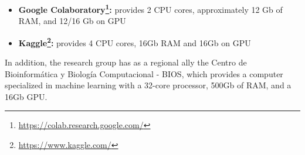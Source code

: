 \begin{itemize}
    \item \textbf{Google Colaboratory\footnote{\url{https://colab.research.google.com/}}:} provides 2 CPU cores, approximately 12 Gb of RAM, and 12/16 Gb on GPU
    \item \textbf{Kaggle\footnote{\url{https://www.kaggle.com/}}:} provides 4 CPU cores, 16Gb RAM and 16Gb on GPU
\end{itemize}

In addition, the research group has as a regional ally the Centro de Bioinformática y Biología Computacional - BIOS, which provides a computer specialized in machine learning with a 32-core processor, 500Gb of RAM, and a 16Gb GPU.